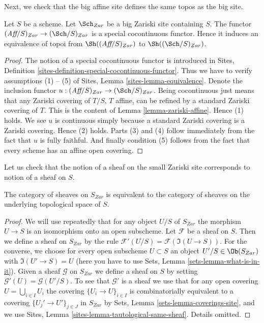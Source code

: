 \noindent
Next, we check that the big affine site defines the same
topos as the big site.

\begin{lemma}
\label{lemma-affine-big-site-Zariski}
Let $S$ be a scheme. Let $\Sch_{Zar}$ be a big Zariski
site containing $S$.
The functor $(\textit{Aff}/S)_{Zar} \to (\Sch/S)_{Zar}$
is a special cocontinuous functor. Hence it induces an equivalence
of topoi from $\Sh((\textit{Aff}/S)_{Zar})$ to
$\Sh((\Sch/S)_{Zar})$.
\end{lemma}

\begin{proof}
The notion of a special cocontinuous functor is introduced in
Sites, Definition \ref{sites-definition-special-cocontinuous-functor}.
Thus we have to verify assumptions (1) -- (5) of
Sites, Lemma \ref{sites-lemma-equivalence}.
Denote the inclusion functor
$u : (\textit{Aff}/S)_{Zar} \to (\Sch/S)_{Zar}$.
Being cocontinuous just means that any Zariski covering of
$T/S$, $T$ affine, can be refined by a standard Zariski covering of $T$.
This is the content of
Lemma \ref{lemma-zariski-affine}.
Hence (1) holds. We see $u$ is continuous simply because a standard
Zariski covering is a Zariski covering. Hence (2) holds.
Parts (3) and (4) follow immediately from the fact that $u$ is
fully faithful. And finally condition (5) follows from the
fact that every scheme has an affine open covering.
\end{proof}

\noindent
Let us check that the notion of a sheaf on the small Zariski site
corresponds to notion of a sheaf on $S$.

\begin{lemma}
\label{lemma-Zariski-usual}
The category of sheaves on $S_{Zar}$ is equivalent to the
category of sheaves on the underlying topological space of $S$.
\end{lemma}

\begin{proof}
We will use repeatedly that for any object
$U/S$ of $S_{Zar}$ the morphism $U \to S$ is an isomorphism
onto an open subscheme.
Let $\mathcal{F}$ be a sheaf on $S$. Then we define a sheaf
on $S_{Zar}$ by the rule $\mathcal{F}'(U/S) = \mathcal{F}(\Im(U \to S))$.
For the converse, we choose for every open subscheme $U \subset S$ an object
$U'/S \in \Ob(S_{Zar})$ with $\Im(U' \to S) = U$
(here you have to use Sets, Lemma \ref{sets-lemma-what-is-in-it}).
Given a sheaf $\mathcal{G}$ on $S_{Zar}$ we define a sheaf on $S$ by setting
$\mathcal{G}'(U) = \mathcal{G}(U'/S)$. To see that $\mathcal{G}'$ is
a sheaf we use that for any open covering $U = \bigcup_{i \in I} U_i$
the covering $\{U_i \to U\}_{i \in I}$
is combinatorially equivalent to a covering $\{U_j' \to U'\}_{j \in J}$
in $S_{Zar}$ by Sets, Lemma \ref{sets-lemma-coverings-site},
and we use Sites, Lemma \ref{sites-lemma-tautological-same-sheaf}.
Details omitted.
\end{proof}


